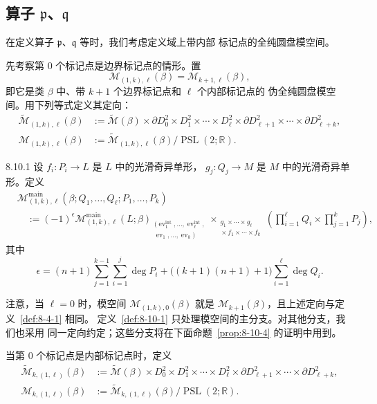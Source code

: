
\subsection{算子 $\mathfrak p$、$\mathfrak q$}
\label{subsec:8-10-2}

在定义算子 $\mathfrak p$、$\mathfrak q$ 等时，我们考虑定义域上带内部
标记点的全纯圆盘模空间。

先考察第 $0$ 个标记点是边界标记点的情形。置
\[
 \mathcal M_{(1,k),\ell}(\beta)=\mathcal M_{k+1,\ell}(\beta),
\]
即它是类 $\beta$ 中、带 $k+1$ 个边界标记点和 $\ell$ 个内部标记点的
伪全纯圆盘模空间。用下列等式定义其定向：
\[
\begin{aligned}
 \widetilde{\mathcal M}_{(1,k),\ell}(\beta)
 &:={\widetilde{\mathcal M}}(\beta)
 \times\partial D_0^2\times D_1^2\times\cdots\times D_\ell^2
 \times\partial D_{\ell+1}^2\times\cdots\times\partial D_{\ell+k}^2,\\
 \mathcal M_{(1,k),\ell}(\beta)
 &:={\widetilde{\mathcal M}}_{(1,k),\ell}(\beta)
 /\operatorname{PSL}(2;\mathbb R).
\end{aligned}
\]

\begin{definition}{8.10.1}\label{def:8-10-1}
设 $f_i\colon P_i\to L$ 是 $L$ 中的光滑奇异单形，
$g_j\colon Q_j\to M$ 是 $M$ 中的光滑奇异单形。定义
\[
\begin{aligned}
&\mathcal M_{(1,k),\ell}^{\mathrm{main}}
(\beta;Q_1,\ldots,Q_\ell;P_1,\ldots,P_k)\\
&\quad:={}
(-1)^\epsilon
\mathcal M_{(1,k),\ell}^{\mathrm{main}}(L;\beta)
{}_{\substack{(\operatorname{ev}_1^{\mathrm{int}},\ldots,
\operatorname{ev}_\ell^{\mathrm{int}},\\
\operatorname{ev}_1,\ldots,\operatorname{ev}_k)}}
\mathop{\times}_{\substack{g_1\times\cdots\times g_\ell\\
{}\times f_1\times\cdots\times f_k}}
\left(\prod_{i=1}^{\ell}Q_i\times\prod_{j=1}^{k}P_j\right),
\end{aligned}
\]
其中
\[
 \epsilon=(n+1)\sum_{j=1}^{k-1}\sum_{i=1}^{j}\deg P_i
 +\bigl((k+1)(n+1)+1\bigr)\sum_{i=1}^{\ell}\deg Q_i.
\]
\end{definition}

注意，当 $\ell=0$ 时，模空间 $\mathcal M_{(1,k),0}(\beta)$ 就是
$\mathcal M_{k+1}(\beta)$，且上述定向与定义~\ref{def:8-4-1} 相同。
定义~\ref{def:8-10-1} 只处理模空间的主分支。对其他分支，我们也采用
同一定向约定；这些分支将在下面命题~\ref{prop:8-10-4} 的证明中用到。

当第 $0$ 个标记点是内部标记点时，定义
\[
\begin{aligned}
 \widetilde{\mathcal M}_{k,(1,\ell)}(\beta)
 &:={\widetilde{\mathcal M}}(\beta)
 \times D_0^2\times D_1^2\times\cdots\times D_\ell^2
 \times\partial D_{\ell+1}^2\times\cdots\times\partial D_{\ell+k}^2,\\
 \mathcal M_{k,(1,\ell)}(\beta)
 &:={\widetilde{\mathcal M}}_{k,(1,\ell)}(\beta)
 /\operatorname{PSL}(2;\mathbb R).
\end{aligned}
\]

